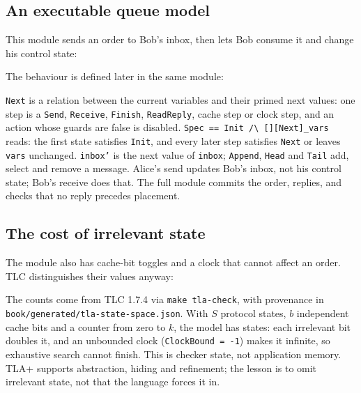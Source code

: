 \subsection{An executable queue model}

This module sends an order to Bob's inbox, then lets Bob consume it and change
his control state:



The behaviour is defined later in the same module:



\texttt{Next} is a relation between the current variables and their primed next
values: one step is a \texttt{Send}, \texttt{Receive}, \texttt{Finish},
\texttt{ReadReply}, cache step or clock step, and an action whose guards are false
is disabled. \verb|Spec == Init /\ [][Next]_vars| reads: the first state
satisfies \texttt{Init}, and every later step satisfies \texttt{Next} or leaves
\texttt{vars} unchanged. \texttt{inbox'} is the next value of \texttt{inbox};
\texttt{Append}, \texttt{Head} and \texttt{Tail} add, select and remove a message.
Alice's send updates Bob's inbox, not his control state; Bob's receive does that.
The full module commits the order, replies, and checks that no reply precedes
placement.

\subsection{The cost of irrelevant state}

The module also has cache-bit toggles and a clock that cannot affect an order.
TLC distinguishes their values anyway:

\begin{center}

\end{center}

The counts come from TLC 1.7.4 via \texttt{make tla-check}, with provenance in
\texttt{book/generated/tla-state-space.json}. With $S$ protocol states, $b$
independent cache bits and a counter from zero to $k$, the model has
states: each irrelevant bit doubles it, and an unbounded clock
(\texttt{ClockBound = -1}) makes it infinite, so exhaustive search cannot finish.
This is checker state, not application memory. TLA+ supports abstraction, hiding
and refinement; the lesson is to omit irrelevant state, not that the language
forces it in.


